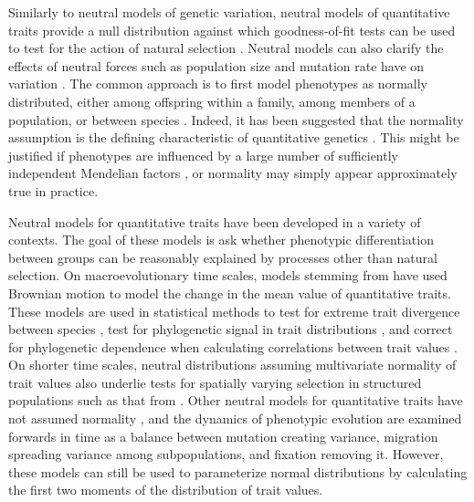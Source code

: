 Similarly to neutral models of genetic variation, neutral models of quantitative
traits provide a null distribution against which goodness-of-fit tests can be
used to test for the action of natural selection \citep{Lande1976}. Neutral
models can also clarify the effects of neutral forces such as population size
and mutation rate have on variation \citep{Lynch1986}. The common approach is to
first model phenotypes as normally distributed, either among offspring within a
family, among members of a population, or between species \citep{Turelli2017}.
Indeed, it has been suggested that the normality assumption is the defining
characteristic of quantitative genetics \citep{Rice2004}. This might be
justified if phenotypes are influenced by a large number of sufficiently
independent Mendelian factors \citep{Fisher1918}, or normality may simply appear
approximately true in practice.

Neutral models for quantitative traits have been developed in a variety of
contexts. The goal of these models is ask whether phenotypic differentiation
between groups can be reasonably explained by processes other than natural
selection. On macroevolutionary time scales, models stemming
from \citet{Lande1976} have used Brownian motion to model the change in the mean
value of quantitative traits. These models are used in statistical methods to
test for extreme trait divergence between species \citep{Turelli1988}, test for
phylogenetic signal in trait distributions \citep{Freckleton2002}, and correct
for phylogenetic dependence when calculating correlations between trait
values \citep{Felsenstein1985}. On shorter time scales, neutral distributions
assuming multivariate normality of trait values also underlie tests for
spatially varying selection in structured populations such as that
from \citet{Ovaskainen2011}. Other neutral models for quantitative traits have
not assumed normality \citep{Chakraborty1982,Lynch1986,Lande1992}, and the
dynamics of phenotypic evolution are examined forwards in time as a balance
between mutation creating variance, migration spreading variance among
subpopulations, and fixation removing it. However, these models can still be
used to parameterize normal distributions by calculating the first two moments
of the distribution of trait values. 


